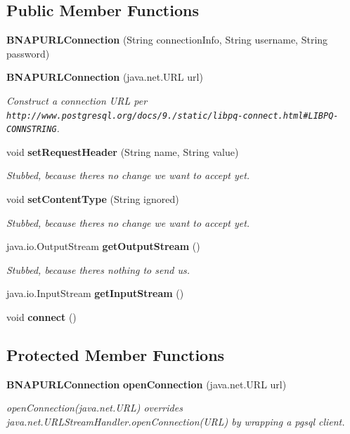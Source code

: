 \subsection*{Public Member Functions}
\begin{DoxyCompactItemize}
\item 
{\bf B\+N\+A\+P\+U\+R\+L\+Connection} (String connection\+Info, String username, String password)
\item 
{\bf B\+N\+A\+P\+U\+R\+L\+Connection} (java.\+net.\+U\+R\+L url)
\begin{DoxyCompactList}\small\item\em Construct a connection U\+R\+L per {\tt http\+://www.\+postgresql.\+org/docs/9./static/libpq-\/connect.\+html\#\+L\+I\+B\+P\+Q-\/\+C\+O\+N\+N\+S\+T\+R\+I\+N\+G}. \end{DoxyCompactList}\item 
void {\bf set\+Request\+Header} (String name, String value)
\begin{DoxyCompactList}\small\item\em Stubbed, because there\textquotesingle{}s no change we want to accept yet. \end{DoxyCompactList}\item 
void {\bf set\+Content\+Type} (String ignored)
\begin{DoxyCompactList}\small\item\em Stubbed, because there\textquotesingle{}s no change we want to accept yet. \end{DoxyCompactList}\item 
java.\+io.\+Output\+Stream {\bf get\+Output\+Stream} ()
\begin{DoxyCompactList}\small\item\em Stubbed, because there\textquotesingle{}s nothing to send us. \end{DoxyCompactList}\item 
java.\+io.\+Input\+Stream {\bf get\+Input\+Stream} ()
\item 
void {\bf connect} ()
\end{DoxyCompactItemize}
\subsection*{Protected Member Functions}
\begin{DoxyCompactItemize}
\item 
{\bf B\+N\+A\+P\+U\+R\+L\+Connection} {\bf open\+Connection} (java.\+net.\+U\+R\+L url)
\begin{DoxyCompactList}\small\item\em open\+Connection(java.\+net.\+U\+R\+L) overrides java.\+net.\+U\+R\+L\+Stream\+Handler.\+open\+Connection(\+U\+R\+L) by wrapping a pgsql client. \end{DoxyCompactList}\end{DoxyCompactItemize}



